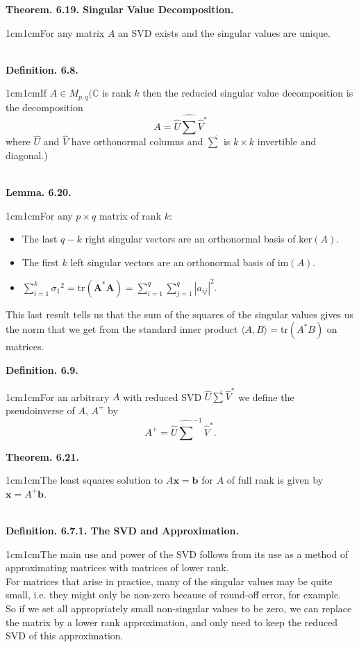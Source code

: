 \documentclass{article}
\newcommand{\vect}[1]{\mathbf{#1}}
\newcommand{\definition}[2]{\textbf{Definition. #1.}\begin{adjustwidth}{1cm}{1cm}#2\end{adjustwidth}}
\newcommand{\theorem}[2]{\textbf{Theorem. #1.}\begin{adjustwidth}{1cm}{1cm}#2\end{adjustwidth}}
\newcommand{\lemma}[2]{\textbf{Lemma. #1.}\begin{adjustwidth}{1cm}{1cm}#2\end{adjustwidth}}
\begin{document}
\theorem{6.19. Singular Value Decomposition}{For any matrix $A$ an SVD exists and the singular values are unique.}~\\
\definition{6.8}{If $A \in M_{p,q}(\mathbb{C}$ is rank $k$ then the reducied singular value decomposition is the decomposition \[A = \hat{U} \hat{\sum} \hat{V}^*\]where $\hat{U}$ and $\hat{V}$ have orthonormal columns and $\hat{\sum}$ is $k \times k$ invertible and diagonal.)}~\\
\lemma{6.20}{For any $p \times q$ matrix of rank $k$:
\begin{itemize}
  \item The last $q - k$ right singular vectors are an orthonormal basis of $\text{ker}(A)$.
  \item The first $k$ left singular vectors are an orthonormal basis of $\text{im}(A)$.
  \item $\sum_{i=1}^k {\sigma_1}^2 = \text{tr}(\vect{A}^* \vect{A}) = \sum_{i=1}^q \sum_{j=1}^q | a_{ij} |^2$.
\end{itemize}
This last result tells us that the sum of the squares of the singular values gives us the norm that we get from the standard inner product $\langle A, B \rangle = \text{tr}(A^*B)$ on matrices.}\newpage
\definition{6.9}{For an arbitrary $A$ with reduced SVD $\hat{U} \hat{\sum} \hat{V}^*$ we define the pseudoinverse of $A$, $A^+$ by \[A^+ = \hat{U} \hat{\sum}^{-1} \hat{V}^*.\]}
\theorem{6.21}{The least squares solution to $A \vect{x} = \vect{b}$ for $A$ of full rank is given by $\vect{x} = A^+ \vect{b}$.}~\\
\definition{6.7.1. The SVD and Approximation}{The main use and power of the SVD follows from its use as a method of approximating matrices with matrices of lower rank.\\For matrices that arise in practice, many of the singular values may be quite small, i.e. they might only be non-zero because of round-off error, for example.\\So if we set all appropriately small non-singular values to be zero, we can replace the matrix by a lower rank approximation, and only need to keep the reduced SVD of this approximation.}
\end{document}
